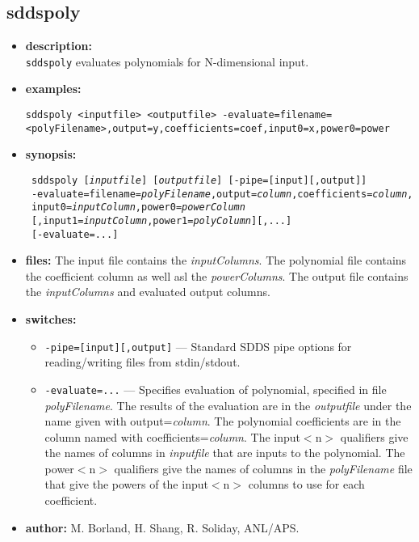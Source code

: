 \newpage 
\subsection{sddspoly} 
\label{sddspoly} 
 
\begin{itemize} 
\item {\bf description:} \hspace*{1mm}\\ 
{\tt sddspoly} evaluates polynomials for N-dimensional input.
\item {\bf examples:} 
\begin{flushleft}
{\tt sddspoly <inputfile> <outputfile> -evaluate=filename=<polyFilename>,output=y,coefficients=coef,input0=x,power0=power }
\end{flushleft} 
\item {\bf synopsis:}  
\begin{flushleft}
{\tt 
sddspoly [{\em inputfile}] [{\em outputfile}] [-pipe=[input][,output]] \\ \
-evaluate=filename={\em polyFilename},output={\em column},coefficients={\em column}, \\ \
input0={\em inputColumn},power0={\em powerColumn} \\ \
[,input1={\em inputColumn},power1={\em polyColumn}][,...] \\ \
[-evaluate=...]}
\end{flushleft} 
\item {\bf files:} 
The input file contains the {\em inputColumns}. The polynomial file contains the coefficient column as well asl the {\em powerColumns}. The output file contains the {\em inputColumns} and evaluated output columns.
\item {\bf switches:} 
    \begin{itemize} 
    \item {\tt -pipe=[input][,output]} --- Standard SDDS pipe options for reading/writing files from stdin/stdout.
    \item {\tt -evaluate=...} --- Specifies evaluation of polynomial, specified in file {\em polyFilename}.  The results of the evaluation are in the {\em outputfile} under the name given with output={\em column}. The polynomial coefficients are in the column named with coefficients={\em column}.  The input$<$n$>$ qualifiers give the names of columns in {\em inputfile} that are inputs to the polynomial.  The power$<$n$>$ qualifiers give the names of columns in the {\em polyFilename} file that give the powers of the input$<$n$>$ columns to use for each coefficient.
\end{itemize} 

\item {\bf author:} M. Borland, H. Shang, R. Soliday, ANL/APS. 
\end{itemize} 
